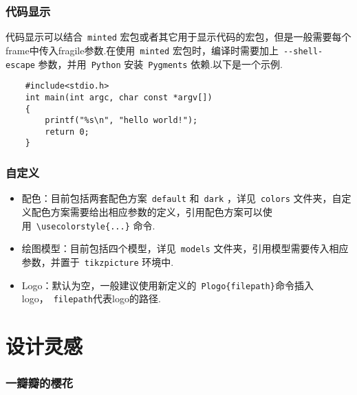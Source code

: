 \documentclass{beamer}
\begin{document}
\begin{frame}[fragile]
    \frametitle{代码显示}
    代码显示可以结合~\verb|minted| 宏包或者其它用于显示代码的宏包，但是一般需要每个frame中传入fragile参数.在使用~\verb|minted| 宏包时，编译时需要加上~\verb|--shell-escape| 参数，并用~\verb|Python| 安装~\verb|Pygments| 依赖.以下是一个示例.
    \begin{verbatim}
    #include<stdio.h>
    int main(int argc, char const *argv[])
    {
        printf("%s\n", "hello world!");
        return 0;
    }
    \end{verbatim}
\end{frame}

\begin{frame}[fragile]
    \frametitle{自定义}
    \begin{itemize}
        \item 配色：目前包括两套配色方案~\verb|default| 和~\verb|dark| ，详见~\verb|colors| 文件夹，自定义配色方案需要给出相应参数的定义，引用配色方案可以使用~\verb|\usecolorstyle{...}| 命令.
        \item 绘图模型：目前包括四个模型，详见~\verb|models| 文件夹，引用模型需要传入相应参数，并置于~\verb|tikzpicture| 环境中.
        \item Logo：默认为空，一般建议使用新定义的~\verb|Plogo{filepath}|命令插入logo，~\verb|filepath|代表logo的路径.
    \end{itemize}
\end{frame}

\section{设计灵感}

\begin{frame}
    \frametitle{一瓣瓣的樱花}
    \begin{figure}
    \centering
    \end{figure}
\end{frame}
\end{document}
